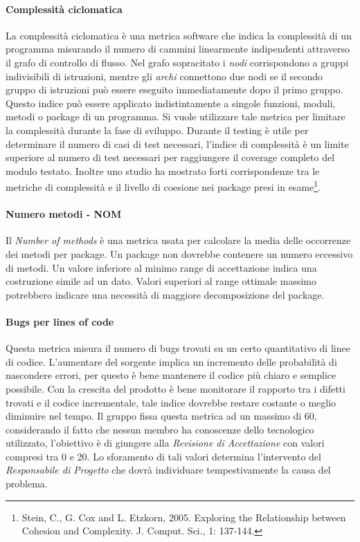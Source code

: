 			\paragraph{Complessità ciclomatica}
			La complessità ciclomatica è una metrica software che indica la complessità di un programma misurando il numero di cammini linearmente indipendenti attraverso il grafo di controllo di flusso. Nel grafo sopracitato i \emph{nodi} corrispondono a gruppi indivisibili di istruzioni, mentre gli \emph{archi} connettono due nodi se il secondo gruppo di istruzioni può essere eseguito immediatamente dopo il primo gruppo.
			Questo indice può essere applicato indistintamente a singole funzioni, moduli, metodi o package di un programma.
			Si vuole utilizzare tale metrica per limitare la complessità durante la fase di sviluppo.
			Durante il testing è utile per determinare il numero di casi di test necessari, l'indice di complessità è un limite superiore al numero di test necessari per raggiungere il coverage completo del modulo testato. Inoltre uno studio ha mostrato forti corrispondenze tra le metriche di complessità e il livello di coesione nei package presi in esame\footnote{Stein, C., G. Cox and L. Etzkorn, 2005. Exploring the Relationship between Cohesion and Complexity. J. Comput. Sci., 1: 137-144.}.\\
			
			\paragraph{Numero metodi - NOM}
			Il \emph{Number of methods} è una metrica usata per calcolare la media delle occorrenze dei metodi per package. Un package non dovrebbe contenere un numero eccessivo di metodi. Un valore inferiore al minimo range di accettazione indica una costruzione simile ad un dato. Valori superiori al range ottimale massimo potrebbero indicare una necessità di maggiore decomposizione del package.\\

			
			\paragraph{Bugs per lines of code}
			Questa metrica misura il numero di bugs trovati su un certo quantitativo di linee di codice. L'aumentare del sorgente implica un incremento delle probabilità di nascondere errori, per questo è bene mantenere il codice più chiaro e semplice possibile. Con la crescita del prodotto è bene monitorare il rapporto tra i difetti trovati e il codice incrementale, tale indice dovrebbe restare costante o meglio diminuire nel tempo.  Il gruppo fissa questa metrica ad un massimo di 60, considerando il fatto che nessun membro ha conoscenze dello  tecnologico utilizzato, l'obiettivo è di giungere alla \emph{Revisione di Accettazione} con valori compresi tra 0 e 20. Lo sforamento di tali valori determina l'intervento del \emph{Responsabile di Progetto} che dovrà individuare tempestivamente la causa del problema.
			
